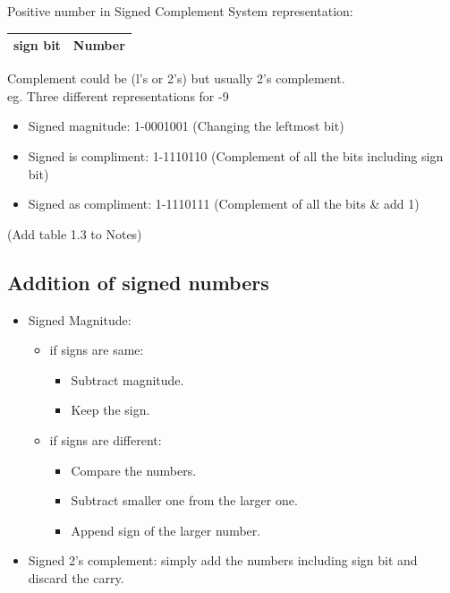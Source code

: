 Positive number in Signed Complement System representation:\\
\begin{table}[H]
\centering
\begin{tabular}{ll}
\hline
\multicolumn{1}{|l|}{\textbf{sign bit}} & \multicolumn{1}{l|}{\textbf{Number}} \\ \hline
\end{tabular}
\end{table}
Complement could be (l's or 2's) but usually 2's complement.\\
eg. Three different representations for -9
\begin{itemize}
    \item Signed magnitude: 1-0001001 (Changing the leftmost bit)
    \item Signed is compliment: 1-1110110 (Complement of all the bits including sign bit)
    \item Signed as compliment: 1-1110111 (Complement of all the bits \& add 1)
\end{itemize}
(Add table 1.3 to Notes) 

\subsection{Addition of signed numbers}
\begin{itemize}
    \item Signed Magnitude: 
    \begin{itemize}
        \item if signs are same: 
        \begin{itemize}
            \item Subtract magnitude.
            \item Keep the sign.
        \end{itemize}
        \item if signs are different: 
        \begin{itemize}
            \item Compare the numbers.
            \item Subtract smaller one from the larger one.
            \item Append sign of the larger number.
        \end{itemize}
    \end{itemize}
    \item Signed 2's complement: simply add the numbers including sign bit and discard the carry. 
\end{itemize}
 
